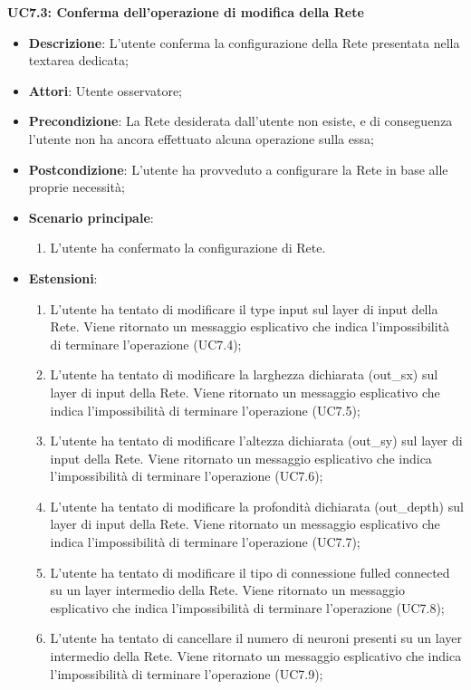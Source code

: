 \textbf{UC7.3: Conferma dell'operazione di modifica della Rete}
\label{UC7.3: Conferma dell'operazione di modifica della Rete}
\noindent
\begin{itemize}
\item \textbf{Descrizione}: L'utente conferma la configurazione della Rete presentata nella textarea dedicata;
\item \textbf{Attori}: Utente osservatore;
\item \textbf{Precondizione}: La Rete desiderata dall'utente non esiste, e di conseguenza l'utente non ha ancora effettuato alcuna operazione sulla essa;
\item \textbf{Postcondizione}: L'utente ha provveduto a configurare la Rete in base alle proprie necessit\`a;
\item \textbf{Scenario principale}:
\begin{enumerate}
\item L'utente ha confermato la configurazione di Rete.
\end{enumerate}
\item \textbf{Estensioni}:
\begin{enumerate}
\item L'utente ha tentato di modificare il type input sul layer di input della Rete. Viene ritornato un messaggio esplicativo che indica l'impossibilit\`a di terminare l'operazione (UC7.4);
\item L'utente ha tentato di modificare la larghezza dichiarata (out\_sx) sul layer di input della Rete. Viene ritornato un messaggio esplicativo che indica l'impossibilit\`a di terminare l'operazione (UC7.5);
\item L'utente ha tentato di modificare l'altezza dichiarata (out\_sy) sul layer di input della Rete. Viene ritornato un messaggio esplicativo che indica l'impossibilit\`a di terminare l'operazione (UC7.6);
\item L'utente ha tentato di modificare la profondit\`a dichiarata (out\_depth) sul layer di input della Rete. Viene ritornato un messaggio esplicativo che indica l'impossibilit\`a di terminare l'operazione (UC7.7);
\item L'utente ha tentato di modificare il tipo di connessione fulled connected su un layer intermedio della Rete. Viene ritornato un messaggio esplicativo che indica l'impossibilit\`a di terminare l'operazione (UC7.8);
\item L'utente ha tentato di cancellare il numero di neuroni presenti su un layer intermedio della Rete. Viene ritornato un messaggio esplicativo che indica l'impossibilit\`a di terminare l'operazione (UC7.9);

\end{enumerate}
\end{itemize}
